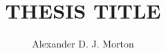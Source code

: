 \documentclass[11pt,a4paper]{report}
\begin{document}
\title{THESIS TITLE}

\author{Alexander D. J. Morton}

\maketitle

\abstract{
%
}



\tableofcontents
\listoftables
\listoffigures



















%
%



 
\end{document}
